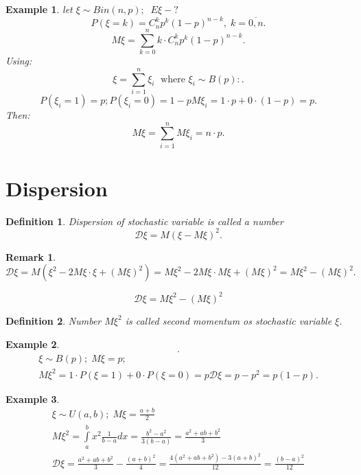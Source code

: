 \documentclass[12pt,letterpaper]{report}
\newtheorem*{example}{Example}
\newtheorem*{remark}{Remark}
\newtheorem{definition}{Definition}
\begin{document}
\begin{example}
    let $\xi \sim Bin(n,p); \;\; E\xi - ?$
    \[
        P(\xi = k) = C_{n}^{k} p^{k} (1-p)^{n-k} , \; k = \overline{0,n}
    .\] 
    \[
        M\xi = \sum_{k=0}^{n} k \cdot C_n^k p^k (1-p)^{n-k}
    .\] 
    Using:
    \[
        \xi = \sum_{i=1} ^{n} \xi_i \; \text{ where } \xi_i \sim B(p):
    .\] 
    \[
        P(\xi_i = 1) = p; P(\xi_i = 0) = 1-p
        M\xi_i = 1 \cdot p + 0 \cdot (1-p) = p
    .\] 
    Then:
    \[
    M\xi = \sum_{i=1}^{n} M\xi_i = n \cdot p
    .\] 
\end{example}

\section{Dispersion}
\begin{definition}
    Dispersion of stochastic variable is called a number
    \[
        \mathcal{D}\xi = M(\xi - M\xi)^2
    .\] 
\end{definition}
\begin{remark}
   \[
       \mathcal{D}\xi = M(\xi^2 - 2M\xi \cdot \xi + (M\xi)^2) = M\xi^2 - 2M\xi \cdot M\xi + (M\xi)^2 = M\xi^2 - (M\xi)^2
   .\]  
\end{remark}
\begin{equation}
    \mathcal{D}\xi = M\xi^2 - (M\xi)^2
\end{equation}

\begin{definition}
    Number $M\xi^2$ is called second momentum os stochastic variable $\xi$.
\end{definition}

\begin{example}
    \[
    .\] 
    \begin{gather*}
        \xi \sim B(p); \; M\xi = p; \\
        M\xi^2 = 1\cdot P(\xi=1) + 0\cdot P(\xi=0) = p
        \mathcal{D}\xi = p - p^2 = p(1-p)
    .\end{gather*}
\end{example}
\begin{example}
    \begin{gather*}
        \xi \sim U(a, b); \; M\xi = \frac{a + b}{2} \\
        M\xi^2 = \int\limits_{a}^{b}x^2 \frac{1}{b-a} dx = \frac{b^2-a^2}{3(b-a)} = \frac{a^2+ab+b^2}{3} \\
        \mathcal{D}\xi = \frac{a^2+ab+b^2}{3} - \frac{(a+b)^2}{4} = \frac{4(a^2+ab+b^2) - 3(a+b)^2}{12} = \frac{(b-a)^2}{12}
    \end{gather*}
\end{example}
\end{document}
